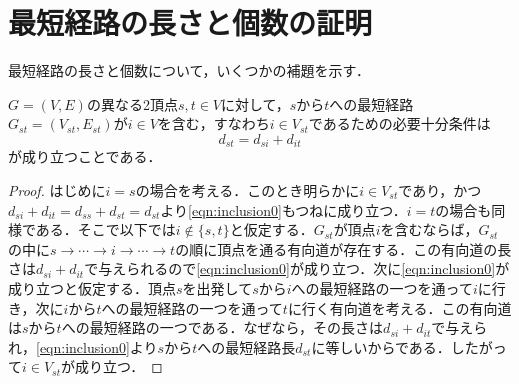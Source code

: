 \chapter{最短経路の長さと個数の証明}
最短経路の長さと個数について，いくつかの補題を示す．

\begin{lemma}
$G=(V,E)$の異なる2頂点$s,t \in V$に対して，$s$から$t$への最短経路$G_{st}=(V_{st},E_{st})$が$i \in V$を含む，すなわち$i \in V_{st}$であるための必要十分条件は
\begin{equation}
  d_{st}=d_{si}+d_{it}
  \label{eqn:inclusion0}
\end{equation}
が成り立つことである．
\label{lemma:1}
\end{lemma}
\begin{proof}
はじめに$i=s$の場合を考える．このとき明らかに$i \in V_{st}$であり，かつ$d_{si}+d_{it}=d_{ss}+d_{st}=d_{st}$より\eqref{eqn:inclusion0}もつねに成り立つ．$i=t$の場合も同様である．そこで以下では$i \not\in \{s,t\}$と仮定する．$G_{st}$が頂点$i$を含むならば，$G_{st}$の中に$s \rightarrow \cdots \rightarrow i \rightarrow \cdots \rightarrow t$の順に頂点を通る有向道が存在する．この有向道の長さは$d_{si}+d_{it}$で与えられるので\eqref{eqn:inclusion0}が成り立つ．次に\eqref{eqn:inclusion0}が成り立つと仮定する．頂点$s$を出発して$s$から$i$への最短経路の一つを通って$i$に行き，次に$i$から$t$への最短経路の一つを通って$t$に行く有向道を考える．この有向道は$s$から$t$への最短経路の一つである．なぜなら，その長さは$d_{si}+d_{it}$で与えられ，\eqref{eqn:inclusion0}より$s$から$t$への最短経路長$d_{st}$に等しいからである．したがって$i \in V_{st}$が成り立つ．
\end{proof}

